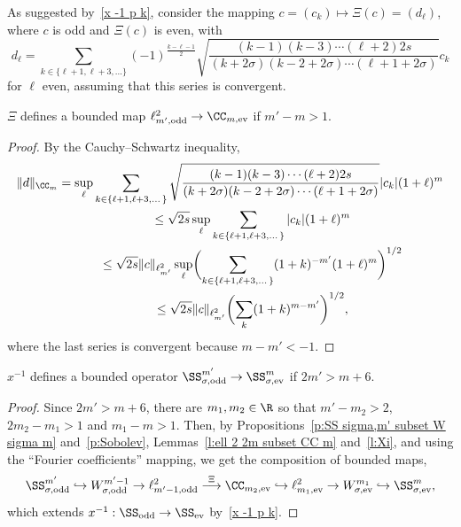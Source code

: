 As suggested by~\eqref{x -1 p k}, consider the mapping $c=(c_k)\mapsto\Xi(c)=(d_\ell)$, where $c$ is odd and $\Xi(c)$ is even, with
  \[
    d_\ell=\sum_{k\in\{\ell+1,\ell+3,\dots\}}(-1)^{\frac{k-\ell-1}{2}}\sqrt{\frac{(k-1)(k-3)\cdots(\ell+2)2s}{(k+2\sigma)(k-2+2\sigma)\cdots(\ell+1+2\sigma)}}
    c_k
  \]
for $\ell$ even, assuming that this series is convergent.

\begin{Lemma}\label{l:Xi}
  $\Xi$ defines a bounded map $\ell^2_{m',\text{\rm odd}}\to\CC_{m,\text{\rm ev}}$ if $m'-m>1$.
\end{Lemma}

\begin{proof}
  By the Cauchy--Schwartz  inequality,
    \begin{gather*}
      \|d\|_{\CC_m} =\sup_\ell\sum_{k\in\{\ell+1,\ell+3,\dots\}}\sqrt{\frac{(k-1)(k-3)\cdots(\ell+2)2s}{(k+2\sigma)(k-2+2\sigma)\cdots(\ell+1+2\sigma)}} |c_k| (1+\ell)^m\\
\hphantom{\|d\|_{\CC_m}}{}
\le\sqrt{2s}\sup_\ell\sum_{k\in\{\ell+1,\ell+3,\dots\}}|c_k| (1+\ell)^m\\
\hphantom{\|d\|_{\CC_m}}{}
\le\sqrt{2s} \|c\|_{\ell^2_{m'}}\sup_\ell\biggl(\sum_{k\in\{\ell+1,\ell+3,\dots\}}(1+k)^{-m'}(1+\ell)^m\biggr)^{1/2}\\
\hphantom{\|d\|_{\CC_m}}{}
\le\sqrt{2s} \|c\|_{\ell^2_{m'}}\biggl(\sum_k(1+k)^{m-m'}\biggr)^{1/2} ,
    \end{gather*}
  where the last series is convergent because $m-m'<-1$.
\end{proof}

 \begin{Corollary}\label{c:x^-1:SS_sigma,odd^m_1 to SS_sigma,ev^m bounded}
  $x^{-1}$ defines a bounded operator $\SS_{\sigma,\text{\rm odd}}^{m'}\to\SS_{\sigma,\text{\rm ev}}^m$ if $2m'>m+6$.
\end{Corollary}

\begin{proof}
  Since $2m'>m+6$, there are $m_1,m_2\in\R$ so that $m'-m_2>2$, $2m_2-m_1>1$ and $m_1-m>1$. Then, by Propositions~\ref{p:SS sigma,m' subset W sigma m} and~\ref{p:Sobolev}, Lemmas~\ref{l:ell 2 2m subset CC m} and~\ref{l:Xi}, and using the ``Fourier coef\/f\/icients'' mapping, we get the composition of bounded maps,
    \[
      \SS_{\sigma,\text{\rm odd}}^{m'}\hookrightarrow W_{\sigma,\text{\rm odd}}^{m'-1}\rightarrow\ell^2_{m'-1,\text{\rm odd}}\overset{\Xi}{\longrightarrow}\CC_{m_2,\text{\rm ev}}\hookrightarrow\ell^2_{m_1,\text{\rm ev}}\rightarrow W_{\sigma,\text{\rm ev}}^{m_1}\hookrightarrow\SS_{\sigma,\text{\rm ev}}^m ,
    \]
  which extends $x^{-1}:\SS_{\text{\rm odd}}\to\SS_{\text{\rm ev}}$ by~\eqref{x -1 p k}.
\end{proof}

